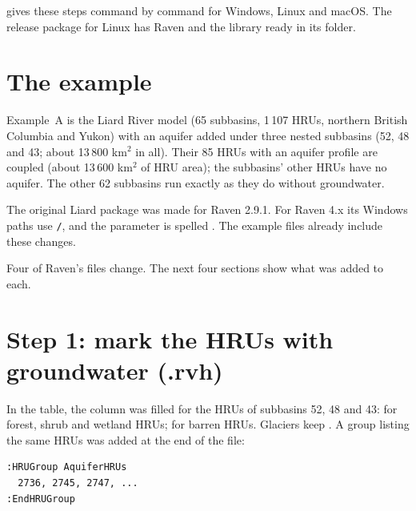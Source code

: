 \begin{inpractice}
 gives these steps command by command for Windows, Linux and macOS. The release package for
Linux has Raven and the library ready in its  folder.
\end{inpractice}

\section{The example}\label{ch:tutorial}
Example~A is the Liard River model (65 subbasins, 1\,107 HRUs, northern British Columbia and Yukon) with an aquifer
added under three nested subbasins (52, 48 and 43; about 13\,800 km$^2$ in all). Their 85 HRUs with an aquifer profile are
coupled (about 13\,600 km$^2$ of HRU area); the subbasins' other HRUs have no aquifer. The other 62 subbasins run
exactly as they do without groundwater.

The original Liard package was made for Raven 2.9.1. For Raven 4.x its Windows paths use \texttt{/}, and the parameter
 is spelled . The example files already include these changes.

Four of Raven's files change. The next four sections show what was added to each.

\section{Step 1: mark the HRUs with groundwater (.rvh)}
In the  table, the  column was filled for the HRUs of subbasins 52, 48 and 43:
 for forest, shrub and wetland HRUs;  for barren HRUs. Glaciers keep
\cmd{[NONE]}. A group listing the same HRUs was added at the end of the file:
\par\noindent\begin{minipage}{\linewidth}
\begin{lstlisting}
:HRUGroup AquiferHRUs
  2736, 2745, 2747, ...
:EndHRUGroup
\end{lstlisting}
\end{minipage}\par\smallskip

